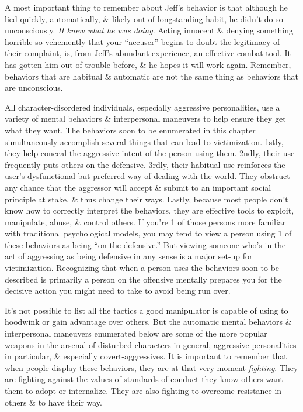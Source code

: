 \documentclass{article}
\numberwithin{equation}{section}
\begin{document}
A most important thing to remember about Jeff's behavior is that although he lied quickly, automatically, \& likely out of longstanding habit, he didn't do so unconsciously. \textit{H knew what he was doing}. Acting innocent \& denying something horrible so vehemently that your ``accuser'' begins to doubt the legitimacy of their complaint, is, from Jeff's abundant experience, an effective combat tool. It has gotten him out of trouble before, \& he hopes it will work again. Remember, behaviors that are habitual \& automatic are not the same thing as behaviors that are unconscious.

All character-disordered individuals, especially aggressive personalities, use a variety of mental behaviors \& interpersonal maneuvers to help ensure they get what they want. The behaviors soon to be enumerated in this chapter simultaneously accomplish several things that can lead to victimization. 1stly, they help conceal the aggressive intent of the person using them. 2ndly, their use frequently puts others on the defensive. 3rdly, their habitual use reinforces the user's dysfunctional but preferred way of dealing with the world. They obstruct any chance that the aggressor will accept \& submit to an important social principle at stake, \& thus change their ways. Lastly, because most people don't know how to correctly interpret the behaviors, they are effective tools to exploit, manipulate, abuse, \& control others. If you're 1 of those persons more familiar with traditional psychological models, you may tend to view a person using 1 of these behaviors as being ``on the defensive.'' But viewing someone who's in the act of aggressing as being defensive in any sense is a major set-up for victimization. Recognizing that when a person uses the behaviors soon to be described is primarily a person on the offensive mentally prepares you for the decisive action you might need to take to avoid being run over.

It's not possible to list all the tactics a good manipulator is capable of using to hoodwink or gain advantage over others. But the automatic mental behaviors \& interpersonal maneuvers enumerated below are some of the more popular weapons in the arsenal of disturbed characters in general, aggressive personalities in particular, \& especially covert-aggressives. It is important to remember that when people display these behaviors, they are at that very moment \textit{fighting}. They are fighting against the values of standards of conduct they know others want them to adopt or internalize. They are also fighting to overcome resistance in others \& to have their way.
\end{document}
